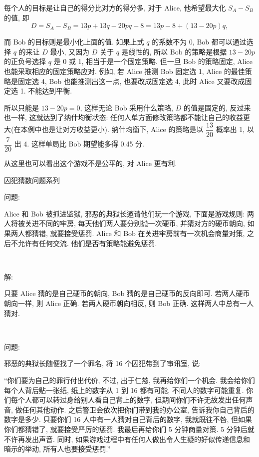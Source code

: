 每个人的目标是让自己的得分比对方的得分多, 对于 Alice, 他希望最大化 $S_A - S_B$ 的值, 即
\[D = S_A - S_B = 13p + 13q - 20pq - 8 = 13p - 8 + (13-20p)q ,\]

而 Bob 的目标则是最小化上面的值. 如果上式 $q$ 的系数不为 0, Bob 都可以通过选择 $q$ 的来让 $D$ 最小, 又因为 $D$ 关于 $q$ 是线性的, 所以 Bob 的策略是根据 $13 - 20p$ 的正负号选择 $q$ 是 0 或 1, 相当于是一个固定策略. 但一旦 Bob 的策略固定, Alice 也能采取相应的固定策略应对. 例如, 若 Alice 推测 Bob 固定选 1, Alice 的最佳策略是固定选 4, Bob 也能推测出这一点, 也要改成固定选 4, 此时 Alice 又要改成固定选 1. 不能达到平衡.

所以只能是 $13 - 20p = 0$, 这样无论 Bob 采用什么策略, $D$ 的值是固定的, 反过来也一样, 这就达到了纳什均衡状态: 任何人单方面修改策略都不能让自己的收益更大(在本例中也是让对方收益更小). 纳什均衡下, Alice 的策略是以 $\dfrac{13}{20}$ 概率出 1, 以 $\dfrac{7}{20}$ 出 4. 这样单局比 Bob 期望能多得 0.45 分. 

从这里也可以看出这个游戏不是公平的, 对 Alice 更有利.

\newpage
\noindent 囚犯猜数问题系列

\noindent 问题:

Alice 和 Bob 被抓进监狱, 邪恶的典狱长邀请他们玩一个游戏, 下面是游戏规则: 两人将被关进不同的牢房, 每天他们两人要分别抛一次硬币, 并猜对方的硬币朝向, 如果两人都猜错, 就要接受惩罚. Alice 和 Bob 在关进牢房前有一次机会商量对策, 之后不允许有任何交流. 他们是否有策略能避免惩罚.

~

\noindent 解: 

只要 Alice 猜的是自己硬币的朝向, Bob 猜的是自己硬币的反向即可. 若两人硬币朝向一样, 则 Alice 正确. 若两人硬币朝向相反, 则 Bob 正确. 这样两人中总有一人猜对.

~

\noindent 问题:

邪恶的典狱长随便找了一个罪名, 将 16 个囚犯带到了审讯室, 说: 

``你们要为自己的罪行付出代价, 不过, 出于仁慈, 我再给你们一个机会. 我会给你们每个人背后贴一张纸, 纸上的数字从 1 到 16 都有可能, 不同人的数字可能重复. 你们每个人都可以转过身给别人看自己背上的数字, 但期间你们不许无故发出任何声音, 做任何其他动作. 之后警卫会依次把你们带到我的办公室, 告诉我你自己背后的数字是多少. 只要你们 16 人中有一人猜对自己背后的数字, 我就既往不咎, 但如果你们都猜错了, 就要接受严厉的惩罚. 我最后再给你们 5 分钟商量对策. 5 分钟后就不许再发出声音. 同时, 如果游戏过程中有任何人做出令人生疑的好似传递信息和暗示的举动, 所有人也要接受惩罚.''


